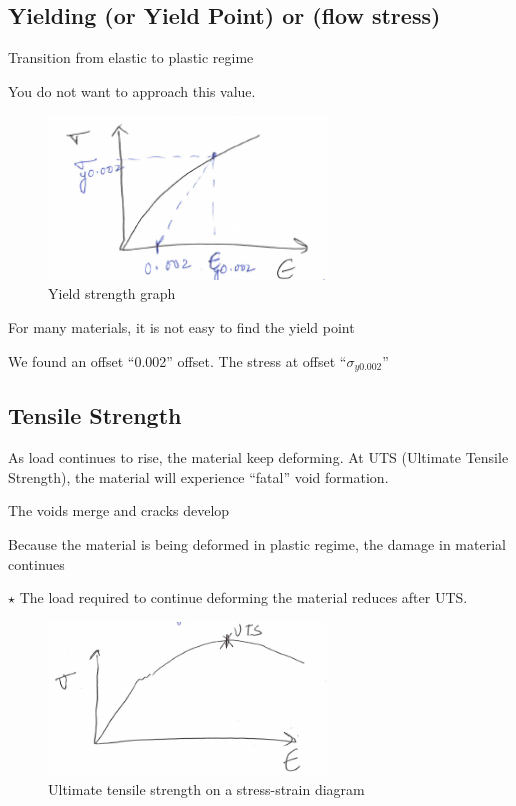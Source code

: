 \documentclass{article}
\begin{document}
\subsection{Yielding (or Yield Point) or (flow stress)}

Transition from elastic to plastic regime

You do not want to approach this value.

\begin{figure}[H]
	\centering
	\includegraphics[width=0.66\textwidth]{assets/83f7972e.png}
	\caption{Yield strength graph}
\end{figure}

For many materials, it is not easy to find the yield point

We found an offset ``0.002'' offset. The stress at offset ``$\sigma_{y0.002}$''

\subsection{Tensile Strength}

As load continues to rise, the material keep deforming. At UTS (Ultimate Tensile Strength), the material will experience ``fatal'' void formation.

\textrightarrow The voids merge and cracks develop

\textrightarrow Because the material is being deformed in plastic regime, the damage in material continues

$\star$ The load required to continue deforming the material reduces after UTS.

\begin{figure}[H]
	\centering
	\includegraphics[width=0.66\textwidth]{assets/a9d11a8c.png}
	\caption{Ultimate tensile strength on a stress-strain diagram}
\end{figure}
\end{document}
